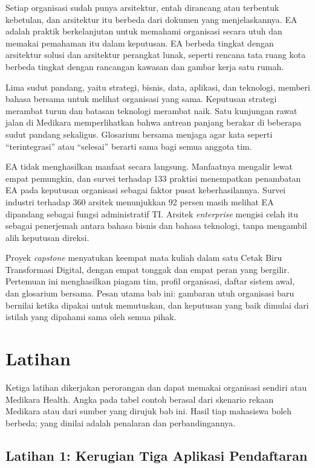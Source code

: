 Setiap organisasi sudah punya arsitektur, entah dirancang atau terbentuk
kebetulan, dan arsitektur itu berbeda dari dokumen yang menjelaskannya. EA
adalah praktik berkelanjutan untuk memahami organisasi secara utuh dan
memakai pemahaman itu dalam keputusan. EA berbeda tingkat dengan arsitektur
solusi dan arsitektur perangkat lunak, seperti rencana tata ruang kota berbeda
tingkat dengan rancangan kawasan dan gambar kerja satu rumah.

Lima sudut pandang, yaitu strategi, bisnis, data, aplikasi, dan teknologi,
memberi bahasa bersama untuk melihat organisasi yang sama. Keputusan strategi
merambat turun dan batasan teknologi merambat naik. Satu kunjungan rawat jalan
di Medikara memperlihatkan bahwa antrean panjang berakar di beberapa sudut
pandang sekaligus. Glosarium bersama menjaga agar kata seperti
``terintegrasi'' atau ``selesai'' berarti sama bagi semua anggota tim.

EA tidak menghasilkan manfaat secara langsung. Manfaatnya mengalir lewat empat
pemungkin, dan survei terhadap 133 praktisi menempatkan penambatan EA pada
keputusan organisasi sebagai faktor pusat keberhasilannya. Survei industri
terhadap 360 arsitek menunjukkan 92 persen masih melihat EA dipandang sebagai
fungsi administratif TI. Arsitek \textit{enterprise} mengisi celah itu sebagai
penerjemah antara bahasa bisnis dan bahasa teknologi, tanpa mengambil alih
keputusan direksi.

Proyek \textit{capstone} menyatukan keempat mata kuliah dalam satu Cetak Biru
Transformasi Digital, dengan empat tonggak dan empat peran yang bergilir.
Pertemuan ini menghasilkan piagam tim, profil organisasi, daftar sistem awal,
dan glosarium bersama. Pesan utama bab ini: gambaran utuh organisasi baru
bernilai ketika dipakai untuk memutuskan, dan keputusan yang baik dimulai dari
istilah yang dipahami sama oleh semua pihak.

\section{Latihan}

Ketiga latihan dikerjakan perorangan dan dapat memakai organisasi sendiri atau
Medikara Health. Angka pada tabel contoh berasal dari skenario rekaan Medikara
atau dari sumber yang dirujuk bab ini. Hasil tiap mahasiswa boleh berbeda;
yang dinilai adalah penalaran dan perbandingannya.

\subsection*{Latihan 1: Kerugian Tiga Aplikasi Pendaftaran}

